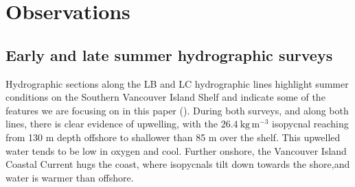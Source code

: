 \documentclass[draft]{agujournal2019}
\begin{document}
\section{Observations}
\label{sec:Observations}

\subsection{Early and late summer hydrographic surveys}

Hydrographic sections along the LB and LC hydrographic lines highlight summer conditions on the Southern Vancouver Island Shelf and indicate some of the features we are focusing on in this paper ().  During both surveys, and along both lines, there is clear evidence of upwelling, with the $26.4\ \mathrm{kg\,m^{-3}}$ isopycnal reaching from 130 m depth offshore to shallower than 85 m over the shelf.  This upwelled water tends to be low in oxygen and cool. Further onshore, the Vancouver Island Coastal Current hugs the coast, where isopycnals tilt down towards the shore,and water is warmer than offshore.
\end{document}
